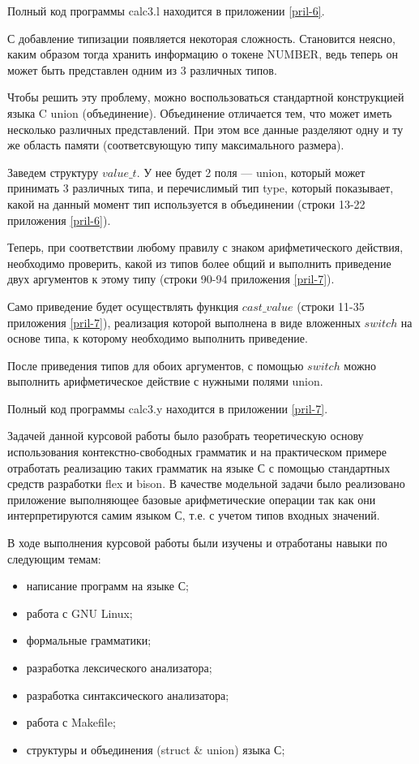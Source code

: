 \documentclass[bachelor, och, coursework, times]{SCWorks}
\begin{document}
Полный код программы calc3.l находится в приложении \ref{pril-6}.

С добавление типизации появляется некоторая сложность. Становится неясно, каким образом тогда хранить информацию о токене NUMBER, ведь теперь он может быть представлен одним из 3 различных типов.

Чтобы решить эту проблему, можно воспользоваться стандартной конструкцией языка C union (объединение). Объединение отличается тем, что может иметь несколько различных представлений. При этом все данные разделяют одну и ту же область памяти (соответсвующую типу максимального размера). ~\cite{kernigan}

Заведем структуру $value\_t$. У нее будет 2 поля --- union, который может принимать 3 различных типа, и перечислимый тип type, который показывает, какой на данный момент тип используется в объединении (строки 13-22 приложения \ref{pril-6}).

Теперь, при соответствии любому правилу с знаком арифметического действия, необходимо проверить, какой из типов более общий и выполнить приведение двух аргументов к этому типу (строки 90-94 приложения \ref{pril-7}).

Само приведение будет осуществлять функция $cast\_value$ (строки 11-35 приложения \ref{pril-7}), реализация которой выполнена в виде вложенных $switch$ на основе типа, к которому необходимо выполнить приведение.

После приведения типов для обоих аргументов, с помощью $switch$ можно выполнить арифметическое действие с нужными полями union.

Полный код программы calc3.y находится в приложении \ref{pril-7}.






\conclusion
Задачей данной курсовой работы было разобрать теоретическую основу использования контекстно-свободных грамматик и на практическом примере отработать реализацию таких грамматик на языке С с помощью стандартных средств разработки flex и bison. В качестве модельной задачи было реализовано приложение выполняющее базовые арифметические операции так как они интерпретируются самим языком С, т.е. с учетом типов входных значений.

В ходе выполнения курсовой работы были изучены и отработаны навыки по следующим темам:
\begin{itemize}
	\item написание программ на языке С;
	\item работа с GNU Linux;
	\item формальные грамматики;
	\item разработка лексического анализатора;
	\item разработка синтаксического анализатора;
	\item работа с Makefile;
	\item структуры и объединения (struct & union) языка С;
\end{itemize}
\end{document}
